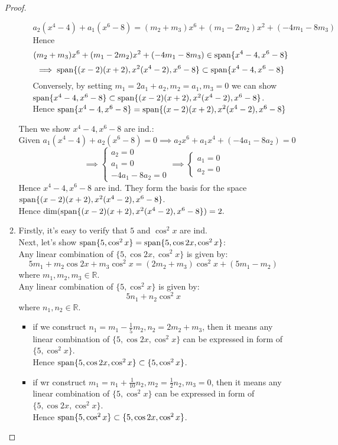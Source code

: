 \begin{enumerate}
\begin{proof}
\begin{enumerate}
\begin{itemize}
\[
a_2(x^4-4)+a_1(x^6-8)=(m_2+m_3)x^6 + (m_1-2m_2)x^2+(-4m_1-8m_3)
\]
Hence 
\[
(m_2+m_3)x^6 + (m_1-2m_2)x^2+(-4m_1-8m_3)\in\operatorname{span}\{x^4-4,x^6-8\}
\]
\[\implies \operatorname{span}\{(x-2)(x+2),x^2(x^4-2),x^6-8\}\subset\operatorname{span}\{x^4-4,x^6-8\}\]
Conversely, by setting $m_1=2a_1+a_2,m_2=a_1,m_3=0$ we can show $\operatorname{span}\{x^4-4,x^6-8\}\subset\operatorname{span}\{(x-2)(x+2),x^2(x^4-2),x^6-8\}$.\\
Hence $\operatorname{span}\{x^4-4,x^6-8\}=\operatorname{span}\{(x-2)(x+2),x^2(x^4-2),x^6-8\}$
\end{itemize}
Then we show $x^4-4,x^6-8$ are ind.:\\
\[\text{Given }
a_1(x^4-4)+a_2(x^6-8) =0\implies
a_2x^6+a_1x^4+(-4a_1-8a_2)=0
\]
\[
\implies \left\{\begin{aligned}
a_2=0\\a_1=0\\-4a_1-8a_2=0
\end{aligned}\right.
\implies \left\{\begin{aligned}
a_1=0\\a_2=0
\end{aligned}\right.
\]
Hence $x^4-4,x^6-8$ are ind. They form the basis for the space $\operatorname{span}\{(x-2)(x+2),x^2(x^4-2),x^6-8\}$.\\
Hence $\dim(\operatorname{span}\{(x-2)(x+2),x^2(x^4-2),x^6-8\})=2.$
\item
Firstly, it's easy to verify that $5$ and $\cos^2x$ are ind.\\
Next, let's show $\operatorname{span}\{5,\cos^2x\}=\operatorname{span}\{5,\cos 2x,\cos^2x\}$:\\
Any linear combination of $\{5,\cos 2x,\cos^2x\}$ is given by:
\[
5m_1+m_2\cos 2x+m_3\cos^2x = (2m_2+m_3)\cos^2x+(5m_1-m_2)
\]
where $m_1,m_2,m_3\in\mathbb{R}$.\\
Any linear combination of $\{5,\cos^2x\}$ is given by:
\[
5n_1+n_2\cos^2x
\]
where $n_1,n_2\in\mathbb{R}$.
\begin{itemize}
\item
if we construct $n_1=m_1-\frac{1}{5}m_2,n_2=2m_2+m_3$, then it means any linear combination of $\{5,\cos 2x,\cos^2x\}$ can be expressed in form of $\{5,\cos^2x\}$. \\Hence $\operatorname{span}\{5,\cos 2x,\cos^2x\}\subset\{5,\cos^2x\}$.
\item
if wr construct $m_1=n_1+\frac{1}{10}n_2,m_2=\frac{1}{2}n_2,m_3=0$, then it means any linear combination of $\{5,\cos^2x\}$ can be expressed in form of $\{5,\cos 2x,\cos^2x\}$.\\
Hence $\operatorname{span}\{5,\cos^2x\}\subset\{5,\cos 2x,\cos^2x\}$.
\end{itemize}

\end{enumerate}
\end{proof}
\end{enumerate}
